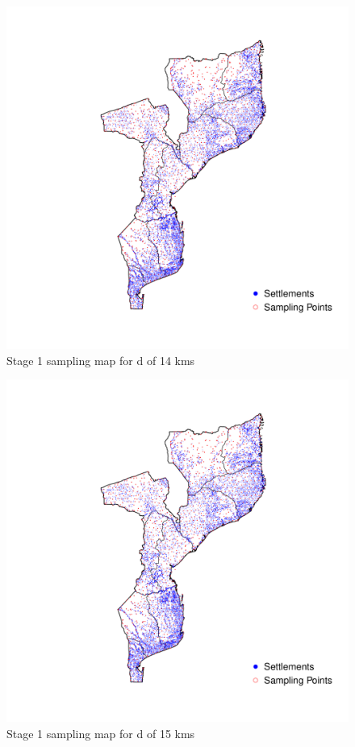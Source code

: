 \documentclass[
  12pt,
  a4paper]{article}
\begin{document}
\begin{figure}[H]

{\centering \includegraphics{mozambiqueNotes_files/figure-latex/stage1plot14-1} 

}

\caption{Stage 1 sampling map for d of 14 kms}\label{fig:stage1plot14}
\end{figure}

\begin{figure}[H]

{\centering \includegraphics{mozambiqueNotes_files/figure-latex/stage1plot15-1} 

}

\caption{Stage 1 sampling map for d of 15 kms}\label{fig:stage1plot15}
\end{figure}

  
\end{document}
